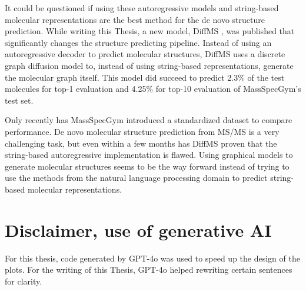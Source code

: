 It could be questioned if using these autoregressive models and string-based molecular representations are the best method for the de novo structure prediction.
While writing this Thesis, a new model, DiffMS \cite{bohde2025diffms}, was published that significantly changes the structure predicting pipeline.
Instead of using an autoregressive decoder to predict molecular structures, DiffMS uses a discrete graph diffusion model to, instead of using string-based representations, generate the molecular graph itself.
This model did succeed to predict 2.3\% of the test molecules for top-1 evaluation and 4.25\% for top-10 evaluation of MassSpecGym's test set.

Only recently has MassSpecGym introduced a standardized dataset to compare performance. De novo molecular structure prediction from \ac{MS/MS} is a very challenging task,
but even within a few months has DiffMS proven that the string-based autoregressive implementation is flawed.
Using graphical models to generate molecular structures seems to be the way forward instead of trying to use the methods from the natural language processing domain to predict string-based molecular representations.

\section*{Disclaimer, use of generative AI}

For this thesis, code generated by GPT-4o was used to speed up the design of the plots.
For the writing of this Thesis, GPT-4o helped rewriting certain sentences for clarity.